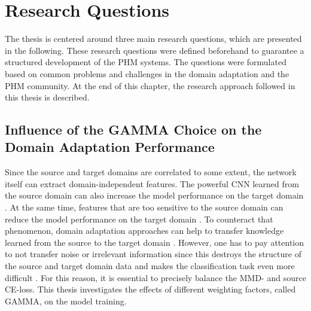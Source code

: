 \chapter{Research Questions}\label{chapter:research_approach}
The thesis is centered around three main research questions, which are presented in the following. These research questions were defined beforehand to guarantee a structured development of the PHM systems. The questions were formulated based on common problems and challenges in the domain adaptation and the PHM community. At the end of this chapter, the research approach followed in this thesis is described.

\section{Influence of the GAMMA Choice on the Domain Adaptation Performance}
Since the source and target domains are correlated to some extent, the network itself can extract domain-independent features. The powerful CNN learned from the source domain can also increase the model performance on the target domain \cite{li2020}. At the same time, features that are too sensitive to the source domain can reduce the model performance on the target domain \cite{li2020}. To counteract that phenomenon, domain adaptation approaches can help to transfer knowledge learned from the source to the target domain \cite{li2020}. However, one has to pay attention to not transfer noise or irrelevant information since this destroys the structure of the source and target domain data and makes the classification task even more difficult \cite{li2020}. For this reason, it is essential to precisely balance the MMD- and source CE-loss. This thesis investigates the effects of different weighting factors, called GAMMA, on the model training.

